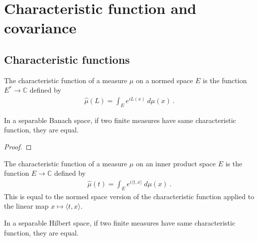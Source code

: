 \chapter{Characteristic function and covariance}

\section{Characteristic functions}
\label{sec:characteristic_function}


\begin{definition}\label{def:charFunDual}
  \mathlibok
The characteristic function of a measure $\mu$ on a normed space $E$ is the function $E^* \to \mathbb{C}$ defined by
\begin{align*}
  \hat{\mu}(L) = \int_E e^{i L(x)} \: d\mu(x) \: .
\end{align*}
\end{definition}


\begin{theorem}\label{thm:ext_of_charFunDual}
  \mathlibok
In a separable Banach space, if two finite measures have same characteristic function, they are equal.
\end{theorem}

\begin{proof}
\end{proof}


\begin{definition}\label{def:charFun}
  \mathlibok
The characteristic function of a measure $\mu$ on an inner product space $E$ is the function $E \to \mathbb{C}$ defined by
\begin{align*}
  \hat{\mu}(t) = \int_E e^{i \langle t, x \rangle} \: d\mu(x) \: .
\end{align*}
This is equal to the normed space version of the characteristic function applied to the linear map $x \mapsto \langle t, x \rangle$.
\end{definition}


\begin{theorem}\label{thm:ext_of_charFun}
  \mathlibok
In a separable Hilbert space, if two finite measures have same characteristic function, they are equal.
\end{theorem}


